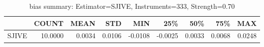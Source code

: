 \begin{table}[ht]
\centering
\caption{bias summary: Estimator=SJIVE, Instruments=333, Strength=0.70}
\begin{tabular}{lrrrrrrrr}
\toprule
 & COUNT & MEAN & STD & MIN & 25\% & 50\% & 75\% & MAX \\
\midrule
SJIVE & 10.0000 & 0.0034 & 0.0106 & -0.0108 & -0.0025 & 0.0033 & 0.0068 & 0.0248 \\
\bottomrule
\end{tabular}
\end{table}
